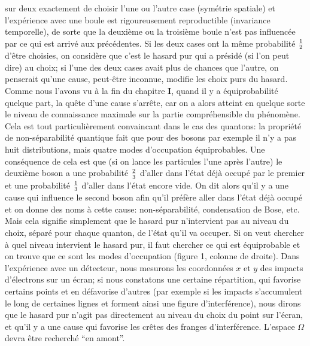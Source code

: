 sur deux exactement de choisir l'une ou l'autre case (sym\'etrie spatiale)
et l'exp\'erience avec une boule est rigoureusement reproductible
(invariance temporelle), de sorte que la deuxi\`eme ou la troisi\`eme
boule n'est pas influenc\'ee par ce qui est arriv\'e aux pr\'ec\'edentes. Si
les deux cases ont la m\^eme probabilit\'e $1 \over 2$ d'\^etre choisies,
on consid\`ere que c'est le hasard pur qui a pr\'esid\'e (si l'on peut dire)
au choix; si l'une des deux cases avait plus de chances que l'autre, on
penserait qu'une cause, peut-\^etre inconnue, modifie les choix purs du
hasard. Comme nous l'avons vu \`a la fin du chapitre {\bf I}, quand il y a
\'equiprobabilit\'e quelque  part, la qu\^ete d'une cause s'arr\^ete, car on
a alors atteint en quelque sorte le niveau de connaissance maximale sur 
la partie compr\'ehensible du ph\'enom\`ene. Cela est tout
particuli\`erement convaincant dans le cas des quantons: la propri\'et\'e
de non-s\'eparabilit\'e quantique fait que pour des bosons par exemple il
n'y a pas huit distributions,  mais quatre modes d'occupation
\'equiprobables. Une cons\'equence de cela est que (si on lance les
particules l'une apr\`es l'autre) le deuxi\`eme boson a une probabilit\'e
$2 \over 3$ d'aller dans l'\'etat d\'ej\`a occup\'e par le premier et  une
probabilit\'e $1 \over 3$ d'aller dans l'\'etat encore vide. On dit alors
qu'il y a une cause qui influence le second boson afin qu'il pr\'ef\`ere
aller dans l'\'etat d\'ej\`a occup\'e et on donne des noms \`a cette cause:
non-s\'eparabilit\'e, condensation de Bose, etc. Mais cela signifie
simplement que le hasard pur n'intervient pas au niveau du choix,
s\'epar\'e pour chaque quanton, de l'\'etat qu'il va occuper. Si on veut
chercher \`a quel niveau intervient le hasard pur, il faut chercher ce qui
est \'equiprobable et on trouve que ce sont les modes d'occupation (figure
1, colonne de droite). 
\medskip  
Dans l'exp\'erience avec un d\'etecteur, nous mesurons les coordonn\'ees
$x$ et $y$ des impacts d'\'electrons sur un \'ecran; si nous constatons 
une certaine r\'epartition, qui favorise certains points et en d\'efavorise
d'autres (par exemple si les impacts s'accumulent le long de certaines
lignes et forment ainsi une figure d'interf\'erence), nous dirons que le
hasard pur n'agit pas directement au niveau du choix du point sur
l'\'ecran, et qu'il y a une cause qui favorise les cr\^etes des franges
d'interf\'erence. L'espace $\Omega$ devra \^etre recherch\'e ``en amont''.
